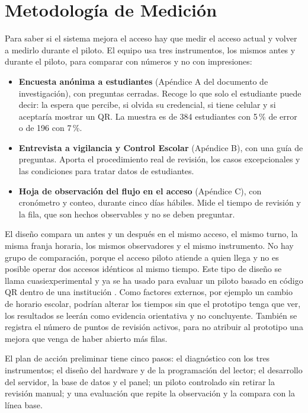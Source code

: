 \section{Metodología de Medición}
Para saber si el sistema mejora el acceso hay que medir el acceso actual y
volver a medirlo durante el piloto. El equipo usa tres instrumentos, los
mismos antes y durante el piloto, para comparar con números y no con
impresiones:
\begin{itemize}
	\item \textbf{Encuesta anónima a estudiantes} (Apéndice A del documento de
	      investigación), con preguntas cerradas. Recoge lo que solo el estudiante
	      puede decir: la espera que percibe, si olvida su credencial, si tiene
	      celular y si aceptaría mostrar un QR. La muestra es de 384 estudiantes con
	      5\,\% de error o de 196 con 7\,\%.
	\item \textbf{Entrevista a vigilancia y Control Escolar} (Apéndice B), con una
	      guía de preguntas. Aporta el procedimiento real de revisión, los casos
	      excepcionales y las condiciones para tratar datos de estudiantes.
	\item \textbf{Hoja de observación del flujo en el acceso} (Apéndice C), con
	      cronómetro y conteo, durante cinco días hábiles. Mide el tiempo de revisión
	      y la fila, que son hechos observables y no se deben preguntar.
\end{itemize}

El diseño compara un antes y un después en el mismo acceso, el mismo turno,
la misma franja horaria, los mismos observadores y el mismo instrumento. No hay
grupo de comparación, porque el acceso piloto atiende a quien llega y no es
posible operar dos accesos idénticos al mismo tiempo. Este tipo de diseño se
llama cuasiexperimental \parencite{campbellstanley1963,
hernandezsampieri2014metodologia} y ya se ha usado para evaluar un piloto
basado en código QR dentro de una institución \parencite{ortiz2026qrpilot}.
Como factores externos, por ejemplo un cambio de horario escolar, podrían
alterar los tiempos sin que el prototipo tenga que ver, los resultados se
leerán como evidencia orientativa y no concluyente. También se registra el
número de puntos de revisión activos, para no atribuir al prototipo una mejora
que venga de haber abierto más filas.

El plan de acción preliminar tiene cinco pasos: el diagnóstico con los tres
instrumentos; el diseño del hardware y de la programación del lector; el
desarrollo del servidor, la base de datos y el panel; un piloto controlado sin
retirar la revisión manual; y una evaluación que repite la observación y la
compara con la línea base.
